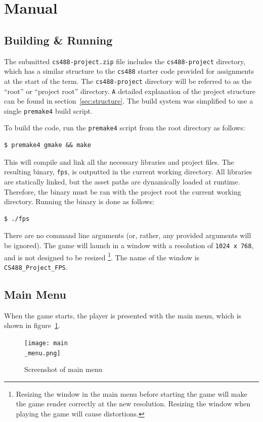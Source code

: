 \documentclass {article}
\begin{document}
\section{Manual}\label{sec:manual}
\subsection{Building \& Running}
The submitted \texttt{cs488-project.zip} file includes the \texttt{cs488-project} directory, which has a similar structure to the \texttt{cs488} starter code provided for assignments at the start of the term. The \texttt{cs488-project} directory will be referred to as the ``root'' or ``project root'' directory. \texttt A detailed explanation of the project structure can be found in section~\ref{sec:structure}. The build system was simplified to use a single \texttt{premake4} build script.

To build the code, run the \texttt{premake4} script from the root directory as follows:
\begin{verbatim}
$ premake4 gmake && make
\end{verbatim}

This will compile and link all the necessary libraries and project files. The resulting binary, \texttt{fps}, is outputted in the current working directory. All libraries are statically linked, but the asset paths are dynamically loaded at runtime. Therefore, the binary must be ran with the project root the current working directory. Running the binary is done as follows:
\begin{verbatim}
$ ./fps
\end{verbatim}

There are no command line arguments (or, rather, any provided arguments will be ignored). The game will launch in a window with a resolution of \texttt{1024 x 768}, and is not designed to be resized \footnote{Resizing the window in the main menu before starting the game will make the game render correctly at the new resolution. Resizing the window when playing the game will cause distortions.}. The name of the window is \texttt{CS488\_Project\_FPS}.

\subsection{Main Menu}
When the game starts, the player is presented with the main menu, which is shown in figure~\ref{fig:mainmenu}.

\begin{figure}[H]
  \begin{center}
  \texttt{[image: main\\\_menu.png]}
  \end{center}
  \caption{Screenshot of main menu}\label{fig:mainmenu}
\end{figure}
\end{document}
